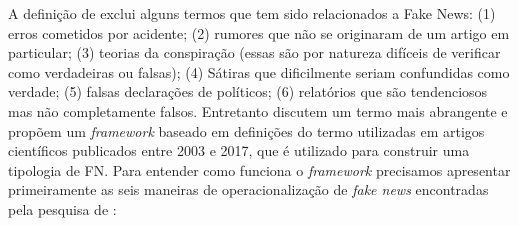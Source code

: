 A definição de \cite{allcott_social_2017} exclui alguns termos que tem sido relacionados a Fake News: (1) erros cometidos por acidente; (2) rumores que não se originaram de um artigo em particular; (3) teorias da conspiração (essas são por natureza difíceis de verificar como verdadeiras ou falsas); (4) Sátiras que dificilmente seriam confundidas como verdade; (5) falsas declarações de políticos; (6) relatórios que são tendenciosos mas não completamente falsos. Entretanto \cite{tandoc_defining_2017} discutem um termo mais abrangente e propõem um \emph{framework} baseado em definições do termo utilizadas em artigos científicos publicados entre 2003 e 2017, que é utilizado para construir uma tipologia de FN. Para entender como funciona o \emph{framework} precisamos apresentar primeiramente as seis maneiras de operacionalização de \emph{fake news} encontradas pela pesquisa de \cite{tandoc_defining_2017}:

